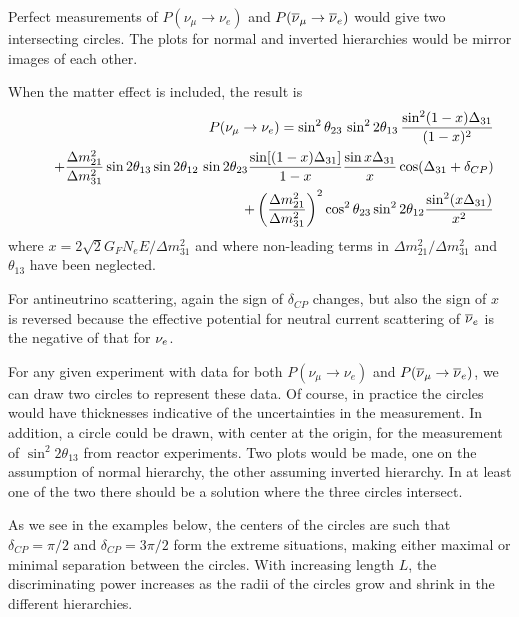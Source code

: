 Perfect measurements of $P(\nu_\mu\to\nu_e)$ and $P(\overline\nu_\mu\to\overline\nu_e)$ would give two intersecting circles.  The plots for normal and inverted hierarchies would be mirror images of each other.


When the matter effect is included, the result is 
\begin{eqnarray}
 &&P(\nu_\mu\to\nu_e)
=\sin^2 \theta_{23}\,\sin^22\theta_{13}\,\frac{\sin^2 (1-x)\Delta_{31}}{(1-x)^2}\nonumber \\
 &&\quad +\frac{\Delta m_{21}^2}{\Delta m_{31}^2}\sin 2\theta_{13}\sin 2\theta_{12}\,\sin 2 \theta_{23}\frac{\sin[(1-x) \Delta_{31}]}{1-x}  \frac{\sin x\Delta_{31}}x\cos(\Delta_{31}+\delta_{CP})\nonumber \\
 &&\qquad\qquad  +\left(\frac{\Delta m_{21}^2}{\Delta m_{31}^2}\right)^2
 \cos^2\theta_{23}\sin^2 2\theta_{12} \frac{\sin^2( x\Delta_{31})}{x^2} 
 \end{eqnarray}
where $x=2\sqrt 2 G_F N_e E/\Delta m_{31}^2$ and where non-leading terms in $\Delta m_{21}^2/\Delta m_{31}^2$ and $\theta_{13}$ have been neglected.  




For antineutrino scattering, again the sign of $\delta_{CP}$ changes, but also the sign of $x$ is reversed because the effective potential for neutral current scattering of $\overline{\nu}_e$ is the negative of that for $\nu_e$.  
 
 
For any given experiment with data for both $P(\nu_\mu\to\nu_e)$ and $P(\overline\nu_\mu\to\overline\nu_e)$, we can draw two circles to represent these data.  Of course, in practice the circles would have  thicknesses indicative of the uncertainties  in the measurement.  In addition, a circle could be drawn, with center at the origin, for the measurement of $\sin^2 2\theta_{13}$ from reactor experiments.  Two plots would be made, one on the assumption of normal hierarchy, the other assuming inverted hierarchy.  In at least one of the two there should be a solution where the three circles intersect.  

As we see in the examples below,  the centers of the circles are such that $\delta_{CP}=\pi/2$ and $\delta_{CP}=3\pi/2$ form the extreme situations, making either maximal or minimal separation between the circles.  
 With increasing length $L$, the discriminating power increases as the radii of the circles grow and shrink in the different hierarchies.

